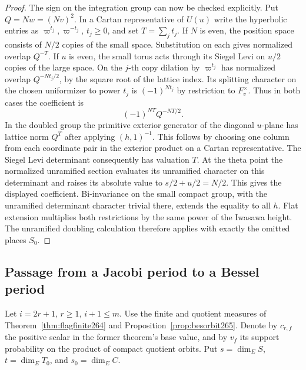 \documentclass[a4paper,11pt]{article}
\theoremstyle{definition}
\theoremstyle{remark}
\numberwithin{equation}{section}
\begin{document}
\begin{proof}
The sign on the integration group can now be checked explicitly.
Put \(Q=Nw=(Nv)^2\). In a Cartan representative of \(U(u)\)
write the hyperbolic entries as \(\varpi^{t_j},\varpi^{-t_j}\),
\(t_j\ge0\), and set \(T=\sum_jt_j\). If \(N\) is even, the
position space consists of \(N/2\) copies of the small space.
Substitution on each gives normalized overlap \(Q^{-T}\).
If \(u\) is even, the small torus acts through its Siegel Levi
on \(u/2\) copies of the large space. On the \(j\)-th copy
dilation by \(\varpi^{t_j}\) has normalized overlap
\(Q^{-Nt_j/2}\), by the square root of the lattice index.
Its splitting character on the chosen uniformizer to power
\(t_j\) is \((-1)^{Nt_j}\) by restriction to \(F_v^\times\).
Thus in both cases the coefficient is
\[
                   (-1)^{NT}Q^{-NT/2}.
\]
In the doubled group the primitive exterior generator of the
diagonal \(u\)-plane has lattice norm \(Q^T\) after applying
\((h,1)^{-1}\). This follows by choosing one column from each
coordinate pair in the exterior product on a Cartan representative.
The Siegel Levi determinant consequently has valuation \(T\).
At the theta point the normalized unramified section evaluates
its unramified character on this determinant and raises its
absolute value to \(s/2+u/2=N/2\). This gives the displayed
coefficient. Bi-invariance on the small compact group, with
the unramified determinant character trivial there, extends the equality
to all \(h\). Flat extension multiplies both restrictions by
the same power of the Iwasawa height. The unramified doubling
calculation therefore applies with exactly the omitted places
\(S_0\).
\end{proof}

\subsection{Passage from a Jacobi period to a Bessel period}\label{nav:IX-41}
Let \(i=2r+1\), \(r\ge1\), \(i+1\le m\). Use the finite
and quotient measures of Theorem~\ref{thm:flagfinite264}
and Proposition~\ref{prop:besorbit265}. Denote by \(c_{r,f}\)
the positive scalar in the former theorem's base value,
and by \(v_f\) its support probability on the product of
compact quotient orbits. Put \(s=\dim_E S\), \(t=\dim_E T_0\),
and \(s_0=\dim_E C\).
\end{document}
